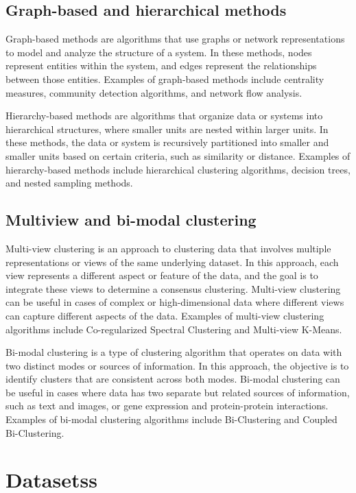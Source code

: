 \documentclass[conference]{IEEEtran}
\begin{document}
\subsection{Graph-based and hierarchical methods}

Graph-based methods are algorithms that use graphs or network representations to model and analyze the structure of a system.
In these methods, nodes represent entities within the system, and edges represent the relationships between those entities.
Examples of graph-based methods include centrality measures, community detection algorithms, and network flow analysis.

Hierarchy-based methods are algorithms that organize data or systems into hierarchical structures, where smaller units are nested within larger units.
In these methods, the data or system is recursively partitioned into smaller and smaller units based on certain criteria, such as similarity or distance.
Examples of hierarchy-based methods include hierarchical clustering algorithms, decision trees, and nested sampling methods.

\subsection{Multiview and bi-modal clustering}

Multi-view clustering is an approach to clustering data that involves multiple representations or views of the same underlying dataset.
In this approach, each view represents a different aspect or feature of the data, and the goal is to integrate these views to determine a consensus clustering.
Multi-view clustering can be useful in cases of complex or high-dimensional data where different views can capture different aspects of the data.
Examples of multi-view clustering algorithms include Co-regularized Spectral Clustering and Multi-view K-Means.

Bi-modal clustering is a type of clustering algorithm that operates on data with two distinct modes or sources of information.
In this approach, the objective is to identify clusters that are consistent across both modes. Bi-modal clustering can be useful in cases where data has two separate but related sources of information, such as text and images, or gene expression and protein-protein interactions.
Examples of bi-modal clustering algorithms include Bi-Clustering and Coupled Bi-Clustering.

\section{Datasetss}
\end{document}
